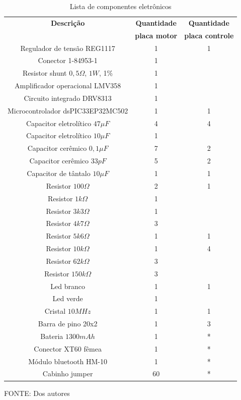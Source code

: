 \documentclass[
	12pt,				%
	openany,			%
	twoside,			%
	a4paper,			%
	english,			%
	french,				%
	spanish,			%
	brazil,				%
	oldfontcommands
	]{abntex2}
\begin{document}
\begin{table}[h]
	\caption{Lista de componentes eletrônicos}
		\centering
	\begin{tabular}{|c|c|c|}
		\hline
		\textbf{Descrição} & \textbf{Quantidade} & \textbf{Quantidade}\\
		  & \textbf{placa motor} & \textbf{placa controle} \\
		\hline 
		Regulador de tensão REG1117 & 1 & 1 \\ 
		\hline 
		Conector  1-84953-1 & 1 & \\ 
		\hline 
		Resistor shunt $0,5\Omega$, $1W$, 1\% & 1 & \\
		\hline 
		Amplificador operacional LMV358 & 1 & \\
		\hline 
		Circuito integrado DRV8313 & 1 & \\
		\hline 
		Microcontrolador dsPIC33EP32MC502 & 1 & 1 \\
		\hline 
		Capacitor eletrolítico $47\mu F$ & 4 & 4 \\
		\hline
		Capacitor eletrolítico $10\mu F$ & 1 & \\
		\hline
		Capacitor cerêmico $0,1\mu F$ & 7 & 2 \\
		\hline
		Capacitor cerêmico $33pF$ & 5 & 2 \\
		\hline
		Capacitor de tântalo $10\mu F$ & 1 & 1 \\
		\hline
		Resistor $100\Omega$ & 2 & 1 \\
		\hline
		Resistor $1k\Omega$ & 1 & \\
		\hline
		Resistor $3k3\Omega$ & 1 & \\
		\hline
		Resistor $4k7\Omega$ & 3 & \\
		\hline
		Resistor $5k6\Omega$ & 1 & 1 \\
		\hline
		Resistor $10k\Omega$ & 1 & 4 \\
		\hline
		Resistor $62k\Omega$ & 3 & \\
		\hline
		Resistor $150k\Omega$ & 3 & \\
		\hline
		Led branco & 1 & 1 \\
		\hline
		Led verde & 1 & \\
		\hline
		Cristal $10MHz$ & 1 & 1 \\
		\hline
		Barra de pino 20x2 & 1 & 3 \\
		\hline
		Bateria $1300mAh$ & 1 & * \\
		\hline
		Conector XT60 fêmea & 1 & * \\
		\hline
		Módulo bluetooth HM-10 & 1 & * \\
		\hline
		Cabinho jumper & 60 & * \\
		\hline
	\end{tabular}
	
	\begin{small}
	\vspace{3pt}	
	FONTE: Dos autores
	\end{small}
	\label{tab:CompElet}
\end{table}
\end{document}
